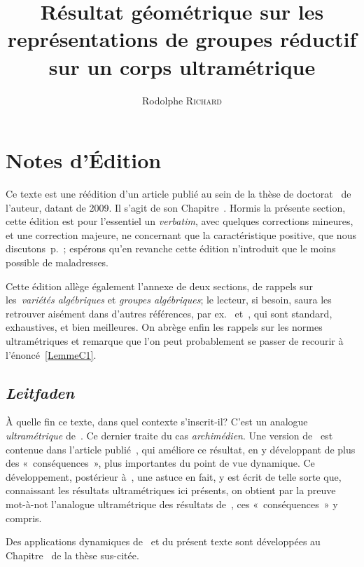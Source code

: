 \documentclass[french]{amsart}
\title[Sur les représentations ultramétriques]{Résultat géométrique sur les représentations de groupes réductif sur un corps ultramétrique}
\author{Rodolphe \textsc{Richard}}
\begin{document}
\maketitle
\setcounter{tocdepth}{0}
\tableofcontents

\section*{Notes d'Édition}

Ce texte est une réédition d'un article publié au sein de la thèse de doctorat~\cite{these} de l'auteur, datant de 2009. Il s'agit de son Chapitre~\uppercase\expandafter{\relax}.  Hormis la présente section, cette édition est pour l'essentiel un \emph{verbatim}, avec quelques corrections mineures, et une correction majeure, ne concernant que la caractéristique positive, que nous discutons~p.~\pageref{Erratum}; espérons qu'en revanche cette édition n'introduit que le moins possible de maladresses.

 Cette édition allège également l'annexe de deux sections, de rappels sur les~\emph{variétés algébriques} et \emph{groupes algébriques}; le lecteur, si besoin, saura les retrouver aisément dans d'autres références, par ex.~\cite{Bor91} et~\cite{PR94}, qui sont standard, exhaustives, et bien meilleures. On abrège enfin les rappels sur les normes ultramétriques et remarque que l'on peut probablement se passer de recourir à l'énoncé~\ref{LemmeC1}.

\subsection*{\emph{Leitfaden}}\label{Leitfaden} À quelle fin ce texte, dans quel contexte s'inscrit-il? C'est un analogue \emph{ultramétrique} de~\cite{RS09}. Ce dernier traite du cas \emph{archimédien}. Une version de~\cite{RS09} est contenue dans l'article publié~\cite{RichardShah}, qui améliore ce résultat, en y développant de plus des «~conséquences~», plus importantes du point de vue dynamique. Ce développement, postérieur à~\cite{these}, une astuce en fait, y est écrit de telle sorte que, connaissant les résultats ultramétriques ici présents, on obtient par la preuve mot-à-not l'analogue ultramétrique des résultats de~\cite{RichardShah}, ces «~conséquences~» y compris.

Des applications dynamiques de~\cite{RS09} et du présent texte sont développées au Chapitre~\uppercase\expandafter{\relax}
 de la thèse sus-citée.
\end{document}

